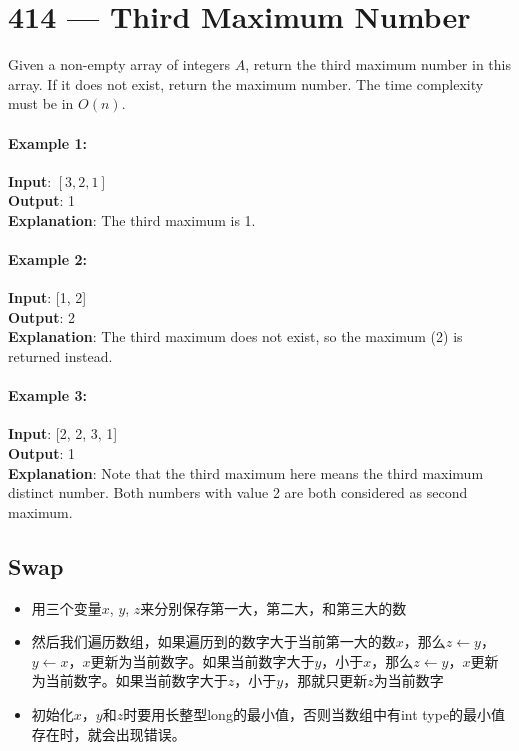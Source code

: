 \section{414 --- Third Maximum Number}
Given a non-empty array of integers $A$, return the third maximum number in this array. If it does not exist, return the maximum number. The time complexity must be in $O(n)$.

\paragraph{Example 1:}

\begin{flushleft}
\textbf{Input}: $[3, 2, 1]$
\\
\textbf{Output}: 1
\\
\textbf{Explanation}: The third maximum is 1.
\end{flushleft}

\paragraph{Example 2:}

\begin{flushleft}
\textbf{Input}: [1, 2]
\\
\textbf{Output}: 2
\\
\textbf{Explanation}: The third maximum does not exist, so the maximum (2) is returned instead.
\end{flushleft}

\paragraph{Example 3:}

\begin{flushleft}
\textbf{Input}: [2, 2, 3, 1]
\\
\textbf{Output}: 1
\\
\textbf{Explanation}: Note that the third maximum here means the third maximum distinct number. Both numbers with value 2 are both considered as second maximum.
\end{flushleft}

\subsection{Swap}
\begin{itemize}
    \item 用三个变量$x$, $y$, $z$来分别保存第一大，第二大，和第三大的数
    \item 然后我们遍历数组，如果遍历到的数字大于当前第一大的数$x$，那么$z\gets y$， $y\gets x$，$x$更新为当前数字。如果当前数字大于$y$，小于$x$，那么$z\gets y$，$x$更新为当前数字。如果当前数字大于$z$，小于$y$，那就只更新$z$为当前数字
    \item 初始化$x$，$y$和$z$时要用长整型long的最小值，否则当数组中有int type的最小值存在时，就会出现错误。
\end{itemize}

